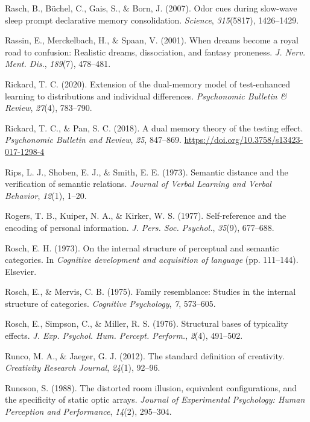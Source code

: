 \documentclass[
]{krantz}
\newlength{\cslhangindent}
\newenvironment{CSLReferences}[2] %
 {\begin{list}{}{%
  \setlength{\itemindent}{0pt}
  \setlength{\leftmargin}{0pt}
  \setlength{\parsep}{0pt}
  \ifodd #1
   \setlength{\leftmargin}{\cslhangindent}
   \setlength{\itemindent}{-1\cslhangindent}
  \fi
  \setlength{\itemsep}{#2\baselineskip}}}
 {\end{list}}
\begin{document}
\begin{CSLReferences}{1}{0}
Rasch, B., Büchel, C., Gais, S., \& Born, J. (2007). Odor cues during slow-wave sleep prompt declarative memory consolidation. \emph{Science}, \emph{315}(5817), 1426--1429.

Rassin, E., Merckelbach, H., \& Spaan, V. (2001). When dreams become a royal road to confusion: Realistic dreams, dissociation, and fantasy proneness. \emph{J. Nerv. Ment. Dis.}, \emph{189}(7), 478--481.

Rickard, T. C. (2020). Extension of the dual-memory model of test-enhanced learning to distributions and individual differences. \emph{Psychonomic Bulletin \& Review}, \emph{27}(4), 783--790.

Rickard, T. C., \& Pan, S. C. (2018). A dual memory theory of the testing effect. \emph{Psychonomic Bulletin and Review}, \emph{25}, 847--869. \url{https://doi.org/10.3758/s13423-017-1298-4}

Rips, L. J., Shoben, E. J., \& Smith, E. E. (1973). Semantic distance and the verification of semantic relations. \emph{Journal of Verbal Learning and Verbal Behavior}, \emph{12}(1), 1--20.

Rogers, T. B., Kuiper, N. A., \& Kirker, W. S. (1977). Self-reference and the encoding of personal information. \emph{J. Pers. Soc. Psychol.}, \emph{35}(9), 677--688.

Rosch, E. H. (1973). On the internal structure of perceptual and semantic categories. In \emph{Cognitive development and acquisition of language} (pp. 111--144). Elsevier.

Rosch, E., \& Mervis, C. B. (1975). Family resemblance: Studies in the internal structure of categories. \emph{Cognitive Psychology}, \emph{7}, 573--605.

Rosch, E., Simpson, C., \& Miller, R. S. (1976). Structural bases of typicality effects. \emph{J. Exp. Psychol. Hum. Percept. Perform.}, \emph{2}(4), 491--502.

Runco, M. A., \& Jaeger, G. J. (2012). The standard definition of creativity. \emph{Creativity Research Journal}, \emph{24}(1), 92--96.

Runeson, S. (1988). The distorted room illusion, equivalent configurations, and the specificity of static optic arrays. \emph{Journal of Experimental Psychology: Human Perception and Performance}, \emph{14}(2), 295--304.


\end{CSLReferences}
\end{document}
